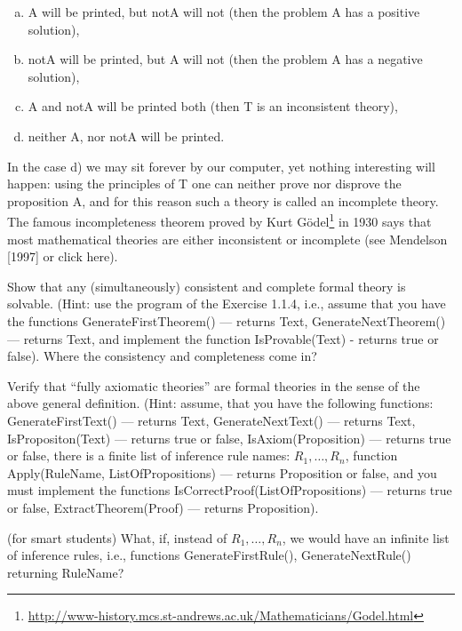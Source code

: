 \begin{enumerate}[(a)]
    \item A will be printed, but notA will not (then the problem A has a positive solution),
    \item notA will be printed, but A will not (then the problem A has a negative solution),
    \item A and notA will be printed both (then T is an inconsistent theory),
    \item neither A, nor notA will be printed.
\end{enumerate}

In the case d) we may sit forever by our computer, yet nothing interesting will happen: using the principles of T one can neither prove nor disprove the proposition A, and for this reason such a theory is called an incomplete theory. The famous incompleteness theorem proved by Kurt G\"{o}del\footnote{\url{http://www-history.mcs.st-andrews.ac.uk/Mathematicians/Godel.html}} in 1930 says that most mathematical theories are either inconsistent or incomplete (see Mendelson [1997] or click here).

\begin{exercise}
Show that any (simultaneously) consistent and complete formal theory is solvable. (Hint: use the program of the Exercise 1.1.4, i.e., assume that you have the functions GenerateFirstTheorem() --- returns Text, GenerateNextTheorem() --- returns Text, and implement the function IsProvable(Text) - returns true or false). Where the consistency and completeness come in?
\end{exercise}

\begin{exercise}
\begin{inparaenum}[(a)]
    \item Verify that ``fully axiomatic theories'' are formal theories in the sense of the above general definition.
    (Hint: assume, that you have the following functions: GenerateFirstText() --- returns Text, GenerateNextText() --- returns Text, IsPropositon(Text) --- returns true or false, IsAxiom(Proposition) --- returns true or false, there is a finite list of inference rule names: \({R_1, \ldots, R_n}\), function Apply(RuleName, ListOfPropositions) --- returns Proposition or false, and you must implement the functions IsCorrectProof(ListOfPropositions) --- returns true or false, ExtractTheorem(Proof) --- returns Proposition).
    \item (for smart students) What, if, instead of \({R_1, \ldots, R_n}\), we would have an infinite list of inference rules, i.e., functions GenerateFirstRule(), GenerateNextRule() returning RuleName?
\end{inparaenum}
\end{exercise}


